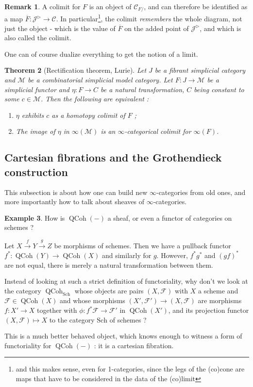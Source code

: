 \documentclass[11pt]{article}
\newtheorem{theorem}{Theorem}[section]
\theoremstyle{definition}
\newtheorem{remark}[theorem]{Remark}
\newtheorem{example}[theorem]{Example}
\newcommand{\C}{\mathcal{C}}
\newcommand{\J}{\mathcal{J}}
\newcommand{\M}{\mathscr{M}}
\newcommand{\QCoh}{\operatorname{QCoh}}
\begin{document}
\begin{remark}
    A colimit for $F$ is an object of $\C_{F/}$, and can therefore be identified as a map $\overline{F} : \J^{\triangleright} \to \C$.
    In particular\footnote{and this makes sense, even for 1-categories, since the legs of the (co)cone are maps that have to be considered in the data of the (co)limit}, the colimit \emph{remembers} the whole diagram, not just the object - which is the value of $\overline{F}$ on the added point of $\J^{\triangleright}$, and which is also called the colimit.
\end{remark}

One can of course dualize everything to get the notion of a limit.

\begin{theorem}[Rectification theorem, Lurie]
    Let $J$ be a fibrant simplicial category and $\M$ be a combinatorial simplicial model category.
    Let $F : J \to \M$ be a simplicial functor and $\eta : F \to C$ be a natural transformation, $C$ being constant to some $c \in \M$.
    Then the following are equivalent :
    \begin{enumerate}
        \item $\eta$ exhibits $c$ as a homotopy colimit of $F$ ;
        \item The image of $\eta$ in $\infty(\M)$ is an $\infty$-categorical colimit for $\infty(F)$.
    \end{enumerate}
\end{theorem}

\subsection{Cartesian fibrations and the Grothendieck construction}

This subsection is about how one can build new $\infty$-categories from old ones, and more importantly how to talk about sheaves of $\infty$-categories.

\begin{example}
    How is $\QCoh(-)$ a sheaf, or even a functor of categories on schemes ?

    Let $X \xrightarrow{f} Y \xrightarrow{g} Z$ be morphisms of schemes.
    Then we have a pullback functor $f^* : \QCoh(Y) \to \QCoh(X)$ and similarly for $g$.
    However, $f^*g^*$ and $(gf)^*$ are not equal, there is merely a natural transformation between them.

    Instead of looking at such a strict definition of functoriality, why don't we look at the category $\QCoh_{\mathrm{Sch}}$ whose objects are pairs $(X, \mathcal{F})$ with $X$ a scheme and $\mathcal{F} \in \QCoh(X)$ and whose morphisms $(X', \mathcal{F}') \to (X, \mathcal{F})$ are morphisms $f : X' \to X$ together with $\phi : f^*\mathcal{F} \to \mathcal{F}'$ in $\QCoh(X')$, and its projection functor $(X, \mathcal{F}) \mapsto X$ to the category $\mathrm{Sch}$ of schemes ?

    This is a much better behaved object, which knows enough to witness a form of functoriality for $\QCoh(-)$ : it is a cartesian fibration.
\end{example}
\end{document}
